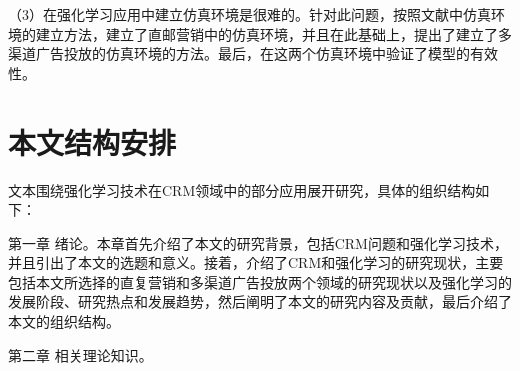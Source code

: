 （3）在强化学习应用中建立仿真环境是很难的。针对此问题，按照文献\citep{pednault2002sequential}中仿真环境的建立方法，建立了直邮营销中的仿真环境，并且在此基础上，提出了建立了多渠道广告投放的仿真环境的方法。最后，在这两个仿真环境中验证了模型的有效性。

\section{本文结构安排}
文本围绕强化学习技术在CRM领域中的部分应用展开研究，具体的组织结构如下：

第一章 绪论。本章首先介绍了本文的研究背景，包括CRM问题和强化学习技术，并且引出了本文的选题和意义。接着，介绍了CRM和强化学习的研究现状，主要包括本文所选择的直复营销和多渠道广告投放两个领域的研究现状以及强化学习的发展阶段、研究热点和发展趋势，然后阐明了本文的研究内容及贡献，最后介绍了本文的组织结构。

第二章 相关理论知识。